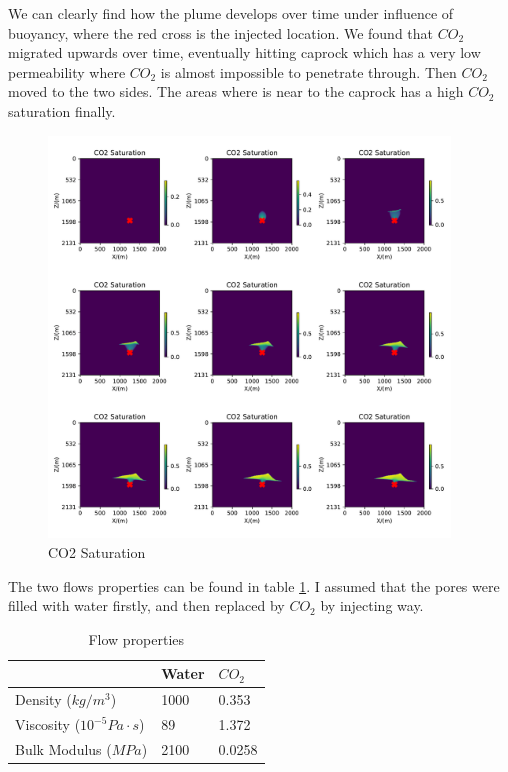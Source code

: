 We can clearly find how the plume develops over time under influence of buoyancy, where 
the red cross is the injected location. 
We found that $CO_2$  migrated upwards over time, eventually hitting caprock which has a very low permeability 
where $CO_2$  is almost impossible to penetrate through.
Then $CO_2$  moved to the two sides.
The areas where is near to the caprock has a high $CO_2$ saturation finally.



\begin{figure}[H]
    \centering
    \includegraphics[width=0.95\textwidth]{figures/project/CO2_Saturation1.pdf}
    \caption{CO2 Saturation}
    \label{fig:CO2_Saturation1}
\end{figure}


The two flows properties can be found in table \ref{tab:flow properties}. I assumed that the pores
were filled with water firstly, and then replaced by $CO_2$ by injecting way.

\begin{table}[h]
    \centering
    \caption{Flow properties}
    \label{tab:flow properties}
    \begin{tabular}{m{4cm}<{\centering} m{4cm}<{\centering} m{4cm}<{\centering}}
        \toprule
           & Water & $CO_2$    \\

        \midrule
        Density ($kg/m^3$) &  1000 & 0.353  \\
        Viscosity ($10^{-5} Pa\cdot s$) & 89    & 1.372\\
        Bulk Modulus ($MPa$) &  2100  & 0.0258  \\

        \bottomrule
    \end{tabular}
\end{table}


